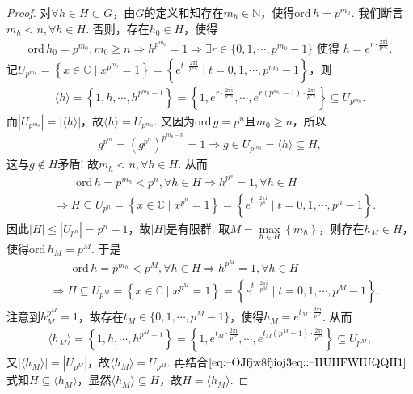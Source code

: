 \documentclass[../../main.tex]{subfiles}%
\begin{document}
\begin{proof}
对$\forall h\in H\subset G$，由$G$的定义和知存在$m_h\in\mathbb{N}$，使得$\mathrm{ord}\,h=p^{m_h}$. 我们断言$m_h<n,\forall h\in H$. 否则，存在$h_0\in H$，使得
\begin{align*}
\mathrm{ord}\,h_0=p^{m_0},m_0\geqslant n\Longrightarrow h^{p^{m_0}}=1\Longrightarrow \exists r\in \{0,1,\cdots,p^{m_0}-1\} \text{ 使得 } h=e^{r\cdot \frac{2\pi \mathrm{i}}{p^{m_0}}}.
\end{align*}
记$U_{p^{m_0}}=\left\{ x\in\mathbb{C} \mid x^{p^{m_0}}=1 \right\} =\left\{ e^{t\cdot \frac{2\pi \mathrm{i}}{p^{m_0}}}\mid t=0,1,\cdots,p^{m_0}-1 \right\}$，则
\begin{align*}
\langle h \rangle =\left\{ 1,h,\cdots,h^{p^{m_0}-1} \right\} =\left\{ 1,e^{r\cdot \frac{2\pi \mathrm{i}}{p^{m_0}}},\cdots,e^{r(p^{m_0}-1)\cdot \frac{2\pi \mathrm{i}}{p^{m_0}}} \right\} \subseteq U_{p^{m_0}}.
\end{align*}
而$| U_{p^{m_0}} |=| \langle h \rangle |$，故$\langle h \rangle =U_{p^{m_0}}$. 又因为$\mathrm{ord}\,g=p^n$且$m_0\geqslant n$，所以
\begin{align*}
g^{p^m}=(g^{p^n})^{p^{m_0-n}}=1\Longrightarrow g\in U_{p^{m_0}}=\langle h \rangle \subseteq H,
\end{align*}
这与$g\notin H$矛盾! 故$m_h<n,\forall h\in H$. 从而
\begin{align*}
&\quad\quad \mathrm{ord}\,h=p^{m_h}<p^n,\forall h\in H\Longrightarrow h^{p^n}=1,\forall h\in H
\\
&\Longrightarrow H\subseteq U_{p^n}=\left\{ x\in\mathbb{C} \mid x^{p^n}=1 \right\} =\left\{ e^{t\cdot \frac{2\pi \mathrm{i}}{p^n}}\mid t=0,1,\cdots,p^n-1 \right\}.
\end{align*}
因此$| H |\leqslant| U_{p^n} |=p^n-1$，故$| H |$是有限群. 取$M=\max\limits_{h\in H}\left\{ m_h \right\}$，则存在$h_M\in H$，使得$\mathrm{ord}\,h_M=p^M$. 于是
\begin{align}
&\quad\quad \mathrm{ord}\,h=p^{m_h}<p^M,\forall h\in H\Longrightarrow h^{p^M}=1,\forall h\in H \nonumber
\\
&\Longrightarrow H\subseteq U_{p^M}=\left\{ x\in\mathbb{C} \mid x^{p^M}=1 \right\} =\left\{ e^{t\cdot \frac{2\pi \mathrm{i}}{p^M}}\mid t=0,1,\cdots,p^M-1 \right\}.\label{eq:--OJfjw8fjioj3eq::--HUHFWIUQQH1}
\end{align}
注意到$h_{M}^{p^M}=1$，故存在$t_M\in \{0,1,\cdots,p^M-1\}$，使得$h_M=e^{t_M\cdot \frac{2\pi \mathrm{i}}{p^M}}$. 从而
\begin{align*}
\langle h_M \rangle =\left\{ 1,h,\cdots,h^{p^M-1} \right\} =\left\{ 1,e^{t_M\cdot \frac{2\pi \mathrm{i}}{p^M}},\cdots,e^{t_M(p^M-1)\cdot \frac{2\pi \mathrm{i}}{p^M}} \right\} \subseteq U_{p^M},
\end{align*}
又$| \langle h_M \rangle |=| U_{p^M} |$，故$\langle h_M \rangle =U_{p^M}$. 再结合$\eqref{eq:--OJfjw8fjioj3eq::--HUHFWIUQQH1}$式知$H\subseteq \langle h_M \rangle$，显然$\langle h_M \rangle \subseteq H$，故$H=\langle h_M \rangle$.
\end{proof}
\end{document}
